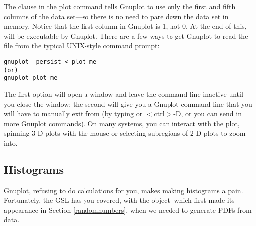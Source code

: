 The clause  in the plot command tells Gnuplot to use
only the first and fifth columns of the data set---so there is no need to pare
down the data set in memory. Notice that the first column in Gnuplot is
1, not 0. At the end of this,  will be executable by
Gnuplot. There are a few ways to get Gnuplot to read the file from the
typical UNIX-style command prompt:
\begin{lstlisting}
gnuplot -persist < plot_me
(or)
gnuplot plot_me -
\end{lstlisting}
The first option will open a window and leave the command line inactive
until you close the window;
the second will give you a Gnuplot command line that you will have to
manually exit
from (by typing  or $<$ctrl$>$-D, or you can send in more
Gnuplot commands). On many systems, you can
interact with the plot, spinning 3-D plots with the mouse or selecting
subregions of 2-D plots to zoom into.

\subsection{Histograms} 
Gnuplot, refusing to do calculations for you,
makes making histograms a pain.  Fortunately, the GSL has you covered,
with the  object, which first made its appearance
in Section \ref{randomnumbers}, when we needed to generate PDFs from data.

